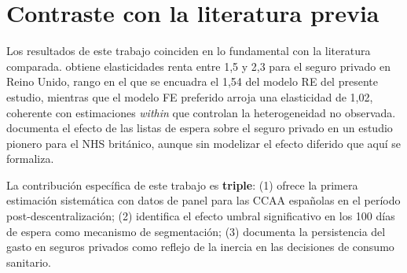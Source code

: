 \section{Contraste con la literatura previa}

Los resultados de este trabajo coinciden en lo fundamental con la literatura
comparada. \textcite{Propper2000} obtiene elasticidades renta entre 1{,}5 y 2{,}3
para el seguro privado en Reino Unido, rango en el que se encuadra el
1{,}54 del modelo RE del presente estudio, mientras que el modelo FE preferido
arroja una elasticidad de 1{,}02, coherente con estimaciones \textit{within} que
controlan la heterogeneidad no observada. \textcite{Besley1999} documenta el efecto
de las listas de espera sobre el seguro privado en un estudio pionero para el NHS
británico, aunque sin modelizar el efecto diferido que aquí se formaliza.

La contribución específica de este trabajo es \textbf{triple}: (1) ofrece la
primera estimación sistemática con datos de panel para las CCAA españolas en el
período post-descentralización; (2) identifica el efecto umbral significativo
en los 100 días de espera como mecanismo de segmentación; (3) documenta la
persistencia del gasto en seguros privados como reflejo de la inercia en las
decisiones de consumo sanitario.
